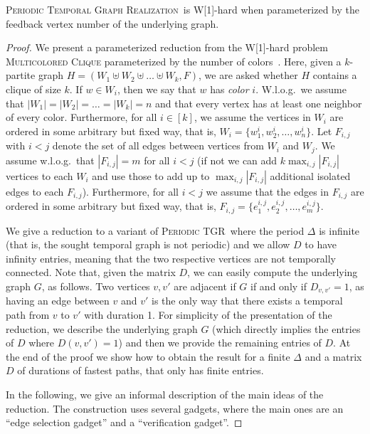 \documentclass[a4paper,UKenglish,cleveref, autoref, thm-restate, anonymous]{lipics-v2021}
\newcommand{\deltaExactLong}{\textsc{Periodic Temporal Graph Realization}}
\newcommand{\deltaExact}{\textsc{Periodic TGR}}
\begin{document}
\begin{theorem}\label{thm:W1wrtFVS}
    \deltaExactLong\ is W[1]-hard when parameterized by the feedback vertex number of the underlying graph.
\end{theorem}
\begin{proof}
    We present a parameterized reduction from the W[1]-hard problem \textsc{Multicolored Clique} parameterized by the number of colors~\cite{fellows2009multipleinterval}.  Here, given a $k$-partite graph $H=(W_1\uplus W_2 \uplus\ldots\uplus W_k, F)$, we are asked whether $H$ contains a clique of size $k$. If $w\in W_i$, then we say that $w$ has \emph{color} $i$. W.l.o.g.\ we assume that $|W_1|=|W_2|=\ldots=|W_k|=n$ and that every vertex has at least one neighbor of every color. 
    Furthermore, for all $i\in[k]$, we assume the vertices in $W_i$ are ordered in some arbitrary but fixed way, that is, $W_i=\{w^i_1,w^i_2,\ldots,w^i_n\}$.
    Let $F_{i,j}$ with $i<j$ denote the set of all edges between vertices from $W_i$ and $W_j$. We assume w.l.o.g.\ that $|F_{i,j}|=m$ for all $i< j$  (if not we can add $k \max_{i,j}|F_{i,j}|$ vertices to each $W_i$ and use those to add up to $\max_{i,j}|F_{i,j}|$ additional isolated edges to each $F_{i,j}$).
    Furthermore, for all $i<j$ we assume that the edges in $F_{i,j}$ are ordered in some arbitrary but fixed way, that is, $F_{i,j}=\{e^{i,j}_1,e^{i,j}_2,\ldots,e^{i,j}_m\}$.

We give a reduction to a variant of \deltaExact\ where the period $\Delta$ is infinite (that is, the sought temporal graph is not periodic) and we allow $D$ to have infinity entries, meaning that the two respective vertices are not temporally connected. 
Note that, given the matrix $D$, we can easily compute the underlying graph $G$, as follows. Two vertices $v,v'$ are adjacent if $G$ if and only if $D_{v,v'}=1$, as having an edge between $v$ and $v'$ is the only way that there exists a temporal path from $v$ to $v'$ with duration 1. 
For simplicity of the presentation of the reduction, we describe the underlying graph $G$ (which directly implies the entries of $D$ where $D(v,v')=1$) and then we provide the remaining entries of $D$. 
At the end of the proof we show how to obtain the result for a finite $\Delta$ and a matrix $D$ of durations of fastest paths, that only has finite entries.



In the following, we give an informal description of the main ideas of the reduction. The construction uses several gadgets, where the main ones are an ``edge selection gadget'' and a ``verification gadget''.



\end{proof}
\end{document}
